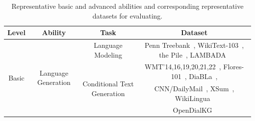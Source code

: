 \begin{table}[htbp]
    \centering  
    \caption{Representative basic and advanced abilities and corresponding representative datasets for evaluating.}
    \footnotesize
    \renewcommand\tabcolsep{2.5pt}
    \begin{tabular}{cccc}
        \toprule
        \textbf{Level} & \textbf{Ability} & \textbf{Task} & \textbf{Dataset} \\
        \midrule
        \multirow{27}{*}{Basic} & \multirow{6}{*}{Language Generation}    &Language Modeling             &Penn Treebank~\cite{Marcus-CL-1993-Building}, WikiText-103~\cite{Merity-ICLR-2017-Pointer}, the Pile~\cite{Gao-arxiv-2021-Pile}, LAMBADA~\cite{Paperno-ACL-2016-LAMBADA} \\ 
        \addlinespace
                                            &    &\multirow{3}{*}{Conditional Text Generation}   & WMT'14,16,19,20,21,22~\cite{Bojar-WMT-2014-Findings,Bojar-WMT-2016-Findings,Barrault-WMT-2019-Findings,Barrault-WMT-2020-Findings,Akhbardeh-WMT-2021-Findings,Kocmi-WMT-2022-Findings}, Flores-101~\cite{Goyal-TACL-2022-The}, DiaBLa~\cite{Bawden-journal-2021-DiaBLa}, \\ 
                                              &  & &  
                                                CNN/DailyMail~\cite{Nallapati-acl-2016-Abstractive}, XSum~\cite{Naryan-EMNLP-2018-XSUM}, WikiLingua~\cite{Ladhak-EMNLP-2020-WikiLingua}\\
                                            & & & OpenDialKG~\cite{Moon-ACL-2019-OpenDialKG} \\
                                                

\end{tabular}
\end{table}
